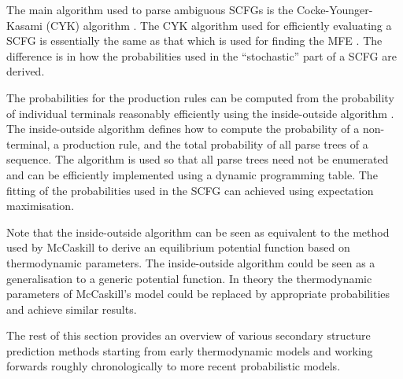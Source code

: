 \documentclass[journal]{IEEEtran}
\begin{document}
The main algorithm used to parse ambiguous SCFGs is the Cocke-Younger-Kasami (CYK) algorithm \cite{giegerich2014introduction, cocke1969programming, younger1967recognition, kasami1965efficient} . The CYK algorithm used for efficiently evaluating a SCFG is essentially the same as that which is used for finding the MFE \cite{zuker1981optimal}. The difference is in how the probabilities used in the ``stochastic'' part of a SCFG are derived.

The probabilities for the production rules can be computed from the probability of individual terminals reasonably efficiently using the inside-outside algorithm \cite{lari1990estimation}. The inside-outside algorithm defines how to compute the probability of a non-terminal, a production rule, and the total probability of all parse trees of a sequence. The algorithm is used so that all parse trees need not be enumerated and can be efficiently implemented using a dynamic programming table. The fitting of the probabilities used in the SCFG can achieved using expectation maximisation. 

Note that the inside-outside algorithm can be seen as equivalent to the method used by McCaskill \cite{mccaskill1990equilibrium} to derive an equilibrium potential function based on thermodynamic parameters. The inside-outside algorithm could be seen as a generalisation to a generic potential function. In theory the thermodynamic parameters of McCaskill's model could be replaced by appropriate probabilities and achieve similar results.

The rest of this section provides an overview of various secondary structure prediction methods starting from early thermodynamic models and working forwards roughly chronologically to more recent probabilistic models.
\end{document}
